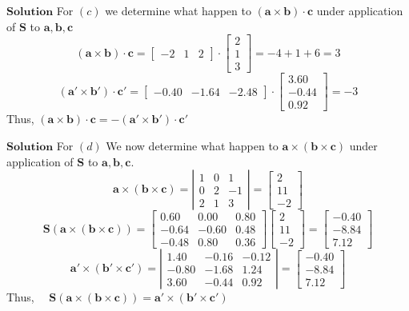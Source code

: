 \documentclass{styles/kaobook}
\begin{document}
$\boxed{\textbf{Solution}}$ For $(c)
$ we determine what happen to $(\mathbf{a} \times \mathbf{b}) \cdot \mathbf{c}$ under application of $\mathbf{S}$ to $\mathbf{a}, \mathbf{b}, \mathbf{c}$
$$
(\mathbf{a} \times \mathbf{b}) \cdot \mathbf{c}=\begin{bmatrix}
-2 & 1 & 2
\end{bmatrix} \cdot\begin{bmatrix}
2 \\
1 \\
3
\end{bmatrix}=-4+1+6=3
$$
$$
\left(\mathbf{a}' \times \mathbf{b}'\right) \cdot \mathbf{c}'=\begin{bmatrix}
-0.40 & -1.64 & -2.48
\end{bmatrix} \cdot\begin{bmatrix}
3.60 \\
-0.44 \\
0.92
\end{bmatrix}=-3
$$
Thus, $(\mathbf{a} \times \mathbf{b}) \cdot \mathbf{c}=-\left(\mathbf{a}' \times \mathbf{b}'\right) \cdot \mathbf{c}'$




$\boxed{\textbf{Solution}}$ For $(d)$ We now determine what happen to $\mathbf{a}\times(\mathbf{b} \times \mathbf{c})$ under application of $\mathbf{S}$ to $\mathbf{a}, \mathbf{b}, \mathbf{c}$.
$$
\mathbf{a}\times(\mathbf{b} \times \mathbf{c})=\left|\begin{array}{ccc}
1 & 0 & 1 \\
0 & 2 & -1 \\
2 & 1 & 3
\end{array}\right|=\begin{bmatrix}
2 \\
11 \\
-2
\end{bmatrix}
$$
$$
\mathbf{S}(\mathbf{a}\times(\mathbf{b} \times \mathbf{c}))=\begin{bmatrix}
0.60 & 0.00 & 0.80 \\
-0.64 & -0.60 & 0.48 \\
-0.48 & 0.80 & 0.36
\end{bmatrix}\begin{bmatrix}
2 \\
11 \\
-2
\end{bmatrix}=\begin{bmatrix}
-0.40 \\
-8.84 \\
7.12
\end{bmatrix}
$$
$$
\mathbf{a}' \times\left(\mathbf{b}' \times \mathbf{c}'\right)=\left|\begin{array}{ccc}
1.40 & -0.16 & -0.12 \\
-0.80 & -1.68 & 1.24 \\
3.60 & -0.44 & 0.92
\end{array}\right|=\begin{bmatrix}
-0.40 \\
-8.84 \\
7.12
\end{bmatrix}
$$
Thus, $\quad \mathbf{S}(\mathbf{a}\times(\mathbf{b} \times \mathbf{c}))=\mathbf{a}' \times\left(\mathbf{b}' \times \mathbf{c}'\right)$
\end{document}
